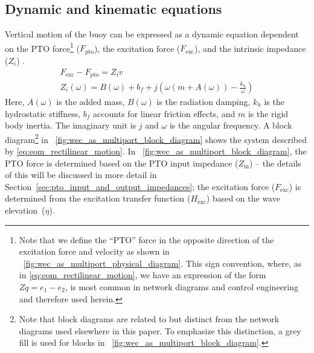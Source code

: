 \documentclass[twocolumn]{autart}
\begin{document}
\subsection{Dynamic and kinematic equations}\label{sec:dynamic_and_kinematic_equations}
Vertical motion of the buoy can be expressed as a dynamic equation dependent on the PTO force\footnote{Note that we define the ``PTO'' force in the opposite direction of the excitation force and velocity as shown in \figurename~\ref{fig:wec_as_multiport_physical_diagram}. This sign convention, where, as in \eqref{eq:eom_rectilinear_motion}, we have an expression of the form $Z q = e_1 - e_2$, is most common in network diagrams and control engineering and therefore used herein.} ($F_{\textrm{pto}}$), the excitation force ($F_{\textrm{exc}}$), and the intrinsic impedance ($Z_i$) \cite{Falnes:2002aa}.
%
\begin{subequations}
\begin{gather}
        F_{\textrm{exc}} - F_{\textrm{pto}} = Z_i v \label{eq:eom_rectilinear_motion} \\
        Z_i(\omega) = B(\omega) + b_f + j \left( \omega \left( m + A(\omega) \right) - \frac{k_{h}}{\omega}\right)
\end{gather}
\end{subequations}
%
\noindent{}Here, $A(\omega)$ is the added mass, $B(\omega)$ is the radiation damping, $k_h$ is the hydrostatic stiffness, $b_f$ accounts for linear friction effects, and $m$ is the rigid body inertia.
The imaginary unit is $j$ and $\omega$ is the angular frequency.
A block diagram\footnote{\label{fn:block_diagrams}Note that block diagrams are related to but distinct from the network diagrams used elsewhere in this paper. To emphasize this distinction, a grey fill is used for blocks in \figurename~\ref{fig:wec_as_multiport_block_diagram}.} in \figurename~\ref{fig:wec_as_multiport_block_diagram} shows the system described by \eqref{eq:eom_rectilinear_motion}.
In \figurename~\ref{fig:wec_as_multiport_block_diagram}, the PTO force is determined based on the PTO input impedance ($Z_{\textrm{in}}$) -- the details of this will be discussed in more detail in Section~\ref{sec:pto_input_and_output_impedances}; the excitation force ($F_{\textrm{exc}}$) is determined from the excitation transfer function ($H_{\textrm{exc}}$) based on the wave elevation~($\eta$).
\end{document}
